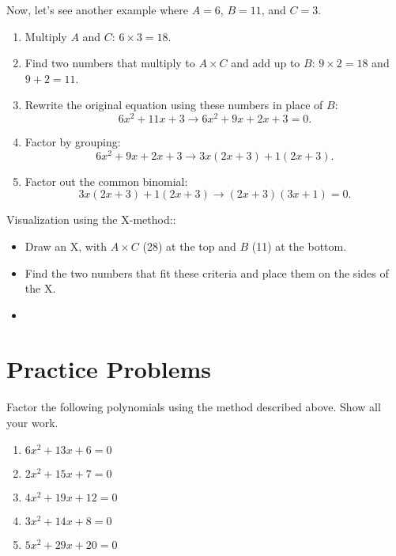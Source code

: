 \documentclass[12pt]{article}
\begin{document}
Now, let's see another example where $A=6$, $B=11$, and $C=3$.

\begin{enumerate}
    \item Multiply $A$ and $C$: $6 \times 3 = 18$.
    \item Find two numbers that multiply to $A \times C$ and add up to $B$: $9 \times 2 = 18$ and $9 + 2 = 11$.
    \item Rewrite the original equation using these numbers in place of $B$: 
    \[
    6x^2 + 11x + 3 \rightarrow 6x^2 + 9x + 2x + 3 = 0.
    \]
    \item Factor by grouping: 
    \[
    6x^2 + 9x + 2x + 3 \rightarrow 3x(2x + 3) + 1(2x + 3).
    \]
    \item Factor out the common binomial: 
    \[
    3x(2x + 3) + 1(2x + 3) \rightarrow (2x + 3)(3x + 1) = 0.
    \]
\end{enumerate}
Visualization using the X-method::
\begin{itemize}
    \item Draw an X, with $A \times C$ (28) at the top and $B$ (11) at the bottom.
    \item Find the two numbers that fit these criteria and place them on the sides of the X.
    \item 
        \begin{center}
        \end{center}
\end{itemize}

\section*{Practice Problems}

Factor the following polynomials using the method described above. Show all your work.

\begin{enumerate}
    \item $6x^2 + 13x + 6 = 0$
    \item $2x^2 + 15x + 7 = 0$
    \item $4x^2 + 19x + 12 = 0$
    \item $3x^2 + 14x + 8 = 0$
    \item $5x^2 + 29x + 20 = 0$
\end{enumerate}
\end{document}
